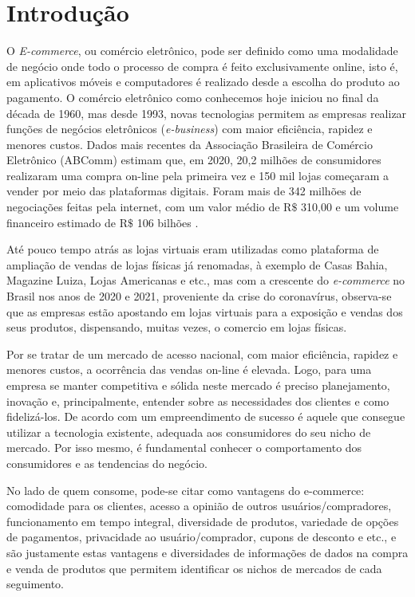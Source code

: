 \section{Introdução}
\label{sec:intro}

O \textit{E-commerce}, ou comércio eletrônico, pode ser definido como uma modalidade de negócio onde todo o processo de compra é feito exclusivamente online, isto é, em aplicativos móveis e computadores é realizado desde a escolha do produto ao pagamento. O comércio eletrônico  como conhecemos hoje iniciou no final da década de 1960, mas desde 1993, novas tecnologias permitem as empresas realizar  funções de negócios eletrônicos (\textit{e-business}) com maior eficiência, rapidez e  menores custos. Dados mais recentes da Associação Brasileira de Comércio  Eletrônico (ABComm) estimam que, em 2020, 20,2 milhões de consumidores realizaram uma compra on-line pela primeira vez e 150 mil lojas começaram a  vender por meio das plataformas digitais. Foram mais de 342 milhões de  negociações feitas pela internet, com um valor médio de R$\$$ 310,00 e um volume financeiro estimado de R$\$$ 106 bilhões \citep{Abcomm2020}.

Até pouco tempo atrás as lojas virtuais eram utilizadas como plataforma  de ampliação de vendas de lojas físicas já renomadas, à exemplo de Casas  Bahia, Magazine Luiza, Lojas Americanas e etc., mas com a crescente do \textit{e-commerce} no Brasil nos anos de 2020 e 2021, proveniente da crise do  coronavírus, observa-se que as empresas estão apostando em lojas virtuais para  a exposição e vendas dos seus produtos, dispensando, muitas vezes, o comercio  em lojas físicas.

Por se tratar de um mercado de acesso nacional, com maior eficiência, rapidez e menores custos, a ocorrência das vendas on-line é elevada. Logo, para uma  empresa se manter competitiva e sólida neste mercado é preciso planejamento,  inovação e, principalmente, entender sobre as necessidades dos clientes e como  fidelizá-los. De acordo com \cite{Efagundes2021} um empreendimento de sucesso é aquele que  consegue utilizar a tecnologia existente, adequada aos consumidores do seu  nicho de mercado. Por isso mesmo, é  fundamental conhecer o comportamento dos consumidores e as tendencias do negócio.

No lado de quem consome, pode-se citar como vantagens do e-commerce: comodidade para os  clientes, acesso a opinião de outros usuários/compradores, funcionamento em tempo integral, diversidade de produtos, variedade de opções de pagamentos,  privacidade ao usuário/comprador, cupons de desconto e etc., e são justamente  estas vantagens e diversidades de informações de dados na compra e venda de  produtos que permitem identificar os nichos de mercados de cada seguimento.


